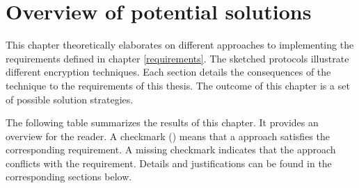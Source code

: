 \documentclass[../main.tex]{subfiles}
\begin{document}
\chapter{Overview of potential solutions}

This chapter theoretically elaborates on different approaches to implementing the requirements defined in chapter \ref{requirements}.
The sketched protocols illustrate different encryption techniques.
Each section details the consequences of the technique to the requirements of this thesis.
The outcome of this chapter is a set of possible solution strategies.

The following table summarizes the results of this chapter.
It provides an overview for the reader.
A checkmark (\checkmark) means that a approach satisfies the corresponding requirement.
A missing checkmark indicates that the approach conflicts with the requirement.
Details and justifications can be found in the corresponding sections below.
\end{document}
